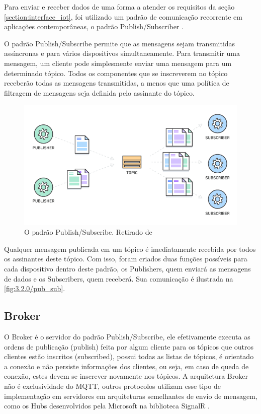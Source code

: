 Para enviar e receber dados de uma forma a atender os requisitos da seção \ref{section:interface_iot}, foi utilizado um padrão de comunicação recorrente em aplicações contemporâneas, o padrão Publish/Subscriber \cite{amazon:pub-sub}.

O padrão Publish/Subscribe permite que as mensagens sejam transmitidas assíncronas e para vários dispositivos simultaneamente. Para transmitir uma mensagem, um cliente pode simplesmente enviar uma mensagem para um determinado tópico. Todos os componentes que se inscreverem no tópico receberão todas as mensagens transmitidas, a menos que uma política de filtragem de mensagens seja definida pelo assinante do tópico.

\begin{figure}[h!]
\centering
\includegraphics[width=12cm]{./02_Capitulos/02_Cap3/figures/aws_pub_sub}
\caption{O padrão Publish/Subscribe. Retirado de \cite{amazon:pub-sub}}
\label{fig:3.2.0/aws_pub_sub}
\end{figure}

Qualquer mensagem publicada em um tópico é imediatamente recebida por todos os assinantes deste tópico. Com isso, foram criados duas funções possíveis para cada dispositivo dentro deste padrão, os Publishers, quem enviará as mensagens de dados e os Subscribers, quem receberá. Sua comunicação é ilustrada na \ref{fig:3.2.0/pub_sub}.

\subsection{Broker}
\label{subsection:broker}

O Broker é o servidor do padrão Publish/Subscribe, ele efetivamente executa as ordens de publicação (publish) feita por algum cliente para os tópicos que outros clientes estão inscritos (subscribed), possui todas as listas de tópicos, é orientado a conexão e não persiste informações dos clientes, ou seja, em caso de queda de conexão, estes devem se inscrever novamente nos tópicos.  A arquitetura Broker não é exclusividade do MQTT, outros protocolos utilizam esse tipo de implementação em servidores em arquiteturas semelhantes de envio de mensagem, como os Hubs desenvolvidos pela Microsoft na biblioteca SignalR \cite{signalr}.

